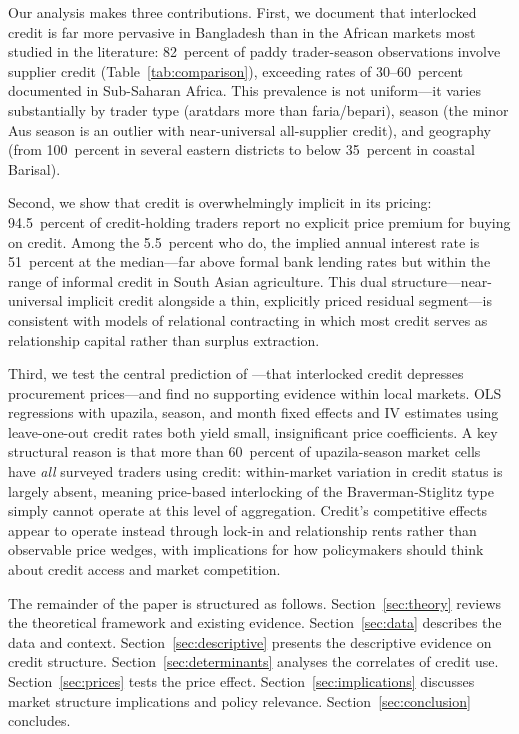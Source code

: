 \documentclass[authoryear,preprint,review,12pt]{elsarticle}
\begin{document}
Our analysis makes three contributions. First, we document that interlocked
credit is far more pervasive in Bangladesh than in the African markets most
studied in the literature: 82~percent of paddy trader-season observations
involve supplier credit (Table~\ref{tab:comparison}), exceeding rates of
30--60~percent documented in Sub-Saharan Africa. This prevalence is not
uniform---it varies substantially by trader type (aratdars more than
faria/bepari), season (the minor Aus season is an outlier with near-universal
all-supplier credit), and geography (from 100~percent in several eastern
districts to below 35~percent in coastal Barisal).

Second, we show that credit is overwhelmingly implicit in its pricing:
94.5~percent of credit-holding traders report no explicit price premium for
buying on credit. Among the 5.5~percent who do, the implied annual interest
rate is 51~percent at the median---far above formal bank lending rates but
within the range of informal credit in South Asian agriculture. This dual
structure---near-universal implicit credit alongside a thin, explicitly priced
residual segment---is consistent with models of relational contracting
\citep{hoff_stiglitz1990, casaburi_macchiavello2019} in which most credit
serves as relationship capital rather than surplus extraction.

Third, we test the central prediction of \citet{braverman_stiglitz1982}---that
interlocked credit depresses procurement prices---and find no supporting
evidence within local markets. OLS regressions with upazila, season, and
month fixed effects and IV estimates using leave-one-out credit rates both
yield small, insignificant price coefficients. A key structural reason is
that more than 60~percent of upazila-season market cells have \emph{all}
surveyed traders using credit: within-market variation in credit status
is largely absent, meaning price-based interlocking of the Braverman-Stiglitz
type simply cannot operate at this level of aggregation. Credit's competitive
effects appear to operate instead through lock-in and relationship rents
rather than observable price wedges, with implications for how policymakers
should think about credit access and market competition.

The remainder of the paper is structured as follows. Section~\ref{sec:theory}
reviews the theoretical framework and existing evidence. Section~\ref{sec:data}
describes the data and context. Section~\ref{sec:descriptive} presents the
descriptive evidence on credit structure. Section~\ref{sec:determinants}
analyses the correlates of credit use. Section~\ref{sec:prices} tests the
price effect. Section~\ref{sec:implications} discusses market structure
implications and policy relevance. Section~\ref{sec:conclusion} concludes.
\end{document}
